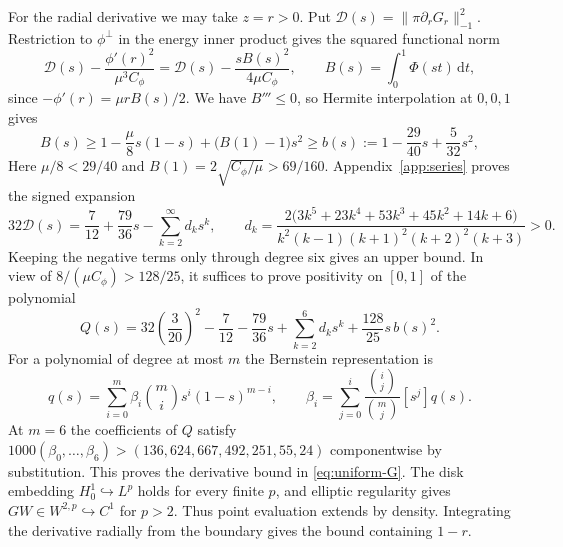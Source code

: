\documentclass[11pt,a4paper,reqno]{amsart}
\theoremstyle{remark}
\numberwithin{equation}{section}
\newcommand{\dd}{\,\mathrm d}
\newcommand{\Cphi}{C_\phi}
\begin{document}
For the radial derivative we may take $z=r>0$. Put
$\mathcal D(s)=\|\pi\partial_rG_r\|_{-1}^2$. Restriction to $\phi^\perp$
in the energy inner product gives the squared functional norm
\begin{equation}\label{eq:proj-D}
  \mathcal D(s)-\frac{\phi'(r)^2}{\mu^3\Cphi}
    =\mathcal D(s)-\frac{sB(s)^2}{4\mu\Cphi},
  \qquad
  B(s)=\int_0^1\Phi(st)\dd t,
\end{equation}
since $-\phi'(r)=\mu rB(s)/2$. We have $B'''\le0$, so Hermite
interpolation at $0,0,1$ gives
\begin{equation}\label{eq:avg-lower}
  B(s)\ge 1-\frac{\mu}{8}s(1-s)+\bigl(B(1)-1\bigr)s^2
      \ge b(s):=1-\frac{29}{40}s+\frac{5}{32}s^2,
\end{equation}
Here $\mu/8<29/40$ and $B(1)=2\sqrt{\Cphi/\mu}>69/160$.
Appendix~\ref{app:series} proves the signed expansion
\begin{equation}\label{eq:D-series}
  32\mathcal D(s)=\frac{7}{12}+\frac{79}{36}s-\sum_{k=2}^\infty d_k s^k,
  \qquad
  d_k=\frac{2\bigl(3k^5+23k^4+53k^3+45k^2+14k+6\bigr)}{k^2(k-1)(k+1)^2(k+2)^2(k+3)}>0.
\end{equation}
Keeping the negative terms only through degree six gives an upper bound.
In view of $8/(\mu\Cphi)>128/25$, it suffices to prove positivity on
$[0,1]$ of the polynomial
\[
  Q(s)=32\left(\frac{3}{20}\right)^2-\frac{7}{12}-\frac{79}{36}s
    +\sum_{k=2}^6 d_k s^k+\frac{128}{25}s\,b(s)^2.
\]
For a polynomial of degree at most $m$ the Bernstein representation is
\begin{equation}\label{eq:bernstein}
  q(s)=\sum_{i=0}^m\beta_i\binom{m}{i}s^i(1-s)^{m-i},
  \qquad
  \beta_i=\sum_{j=0}^i\frac{\binom{i}{j}}{\binom{m}{j}}[s^j]q(s).
\end{equation}
At $m=6$ the coefficients of $Q$ satisfy
$1000(\beta_0,\ldots,\beta_6)>(136,624,667,492,251,55,24)$ componentwise
by substitution. This proves the derivative bound in \eqref{eq:uniform-G}.
The disk embedding $H_0^1\hookrightarrow L^p$ holds for every finite $p$,
and elliptic regularity gives $GW\in W^{2,p}\hookrightarrow C^1$ for $p>2$.
Thus point evaluation extends by density. Integrating the derivative
radially from the boundary gives the bound containing $1-r$.
\end{document}
